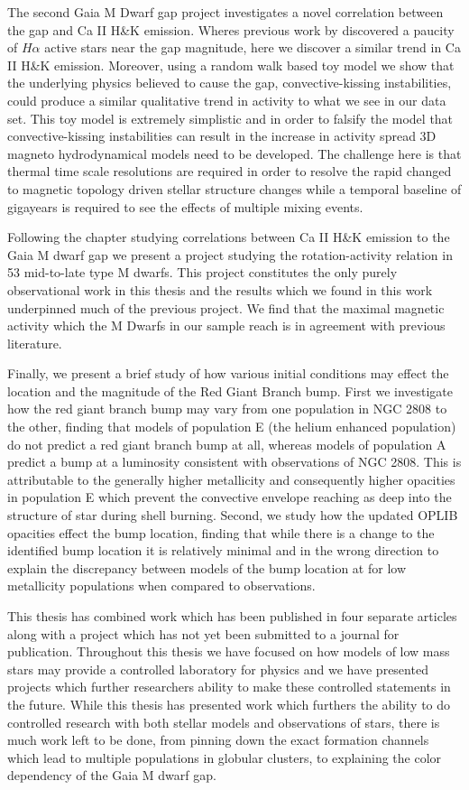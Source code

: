 The second Gaia M Dwarf gap project investigates a novel correlation between
the gap and Ca II H\&K emission. Wheres previous work by \citet{Jao2023}
discovered a paucity of $H\alpha$ active stars near the gap magnitude, here we
discover a similar trend in Ca II H\&K emission. Moreover, using a random walk
based toy model we show that the underlying physics believed to cause the gap,
convective-kissing instabilities, could produce a similar qualitative trend in
activity to what we see in our data set. This toy model is extremely simplistic
and in order to falsify the model that convective-kissing instabilities can
result in the increase in activity spread 3D magneto hydrodynamical models need
to be developed. The challenge here is that thermal time scale resolutions are
required  in order to resolve the rapid changed to magnetic topology driven
stellar structure changes while a temporal baseline of gigayears is required to
see the effects of multiple mixing events. 

Following the chapter studying correlations between Ca II H\&K emission to the
Gaia M dwarf gap we present a project studying the rotation-activity relation
in 53 mid-to-late type M dwarfs. This project constitutes the only purely
observational work in this thesis and the results which we found in this
work underpinned much of the previous project. We find that the maximal
magnetic activity which the M Dwarfs in our sample reach is in agreement with
previous literature.

Finally, we present a brief study of how various initial conditions may effect
the location and the magnitude of the Red Giant Branch bump. First we
investigate how the red giant branch bump may vary from one population in NGC
2808 to the other, finding that models of population E (the helium enhanced
population) do not predict a red giant branch bump at all, whereas models of
population A predict a bump at a luminosity consistent with observations of NGC
2808. This is attributable to the generally higher metallicity and consequently
higher opacities in population E which prevent the convective envelope reaching
as deep into the structure of star during shell burning. Second, we study how
the updated OPLIB opacities effect the bump location, finding that while there
is a change to the identified bump location it is relatively minimal and in the
wrong direction to explain the discrepancy between models of the
bump location at for low metallicity populations when compared to
observations.

This thesis has combined work which has been published in four separate
articles along with a project which has not yet been submitted to a journal for
publication. Throughout this thesis we have focused on how models of low mass
stars may provide a controlled laboratory for physics and we have presented
projects which further researchers ability to make these controlled statements
in the future. While this thesis has presented work which furthers the ability
to do controlled research with both stellar models and observations of stars,
there is much work left to be done, from pinning down the exact formation
channels which lead to multiple populations in globular clusters, to explaining
the color dependency of the Gaia M dwarf gap.

